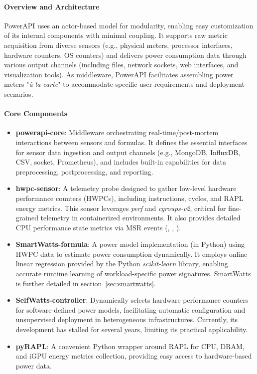 \paragraph{Overview and Architecture}

PowerAPI uses an actor-based model for modularity, enabling easy customization of its internal components with minimal coupling. It supports raw metric acquisition from diverse sensors (e.g., physical meters, processor interfaces, hardware counters, OS counters) and delivers power consumption data through various output channels (including files, network sockets, web interfaces, and visualization tools). As middleware, PowerAPI facilitates assembling power meters "\textit{à la carte}" to accommodate specific user requirements and deployment scenarios.

\paragraph{Core Components}
\begin{itemize}
    \item \textbf{powerapi-core}: Middleware orchestrating real-time/post-mortem interactions between sensors and formulas. It defines the essential interfaces for sensor data ingestion and output channels (e.g., MongoDB, InfluxDB, CSV, socket, Prometheus), and includes built-in capabilities for data preprocessing, postprocessing, and reporting.
    \item \textbf{hwpc-sensor}: A telemetry probe designed to gather low-level hardware performance counters (HWPCs), including instructions, cycles, and RAPL energy metrics. This sensor leverages \textit{perf} and \textit{cgroups-v2}, critical for fine-grained telemetry in containerized environments. It also provides detailed CPU performance state metrics via MSR events (, , ).
    \item \textbf{SmartWatts-formula}\parencite{fieni2020smartwatts}: A power model implementation (in Python) using HWPC data to estimate power consumption dynamically. It employs online linear regression provided by the Python \textit{scikit-learn}\parencite{scikit-learn} library, enabling accurate runtime learning of workload-specific power signatures. SmartWatts is further detailed in section~\ref{sec:smartwatts}.
    \item \textbf{SelfWatts-controller}: Dynamically selects hardware performance counters for software-defined power models, facilitating automatic configuration and unsupervised deployment in heterogeneous infrastructures. Currently, its development has stalled for several years, limiting its practical applicability.
    \item \textbf{pyRAPL}: A convenient Python wrapper around RAPL for CPU, DRAM, and iGPU energy metrics collection, providing easy access to hardware-based power data.
\end{itemize}


